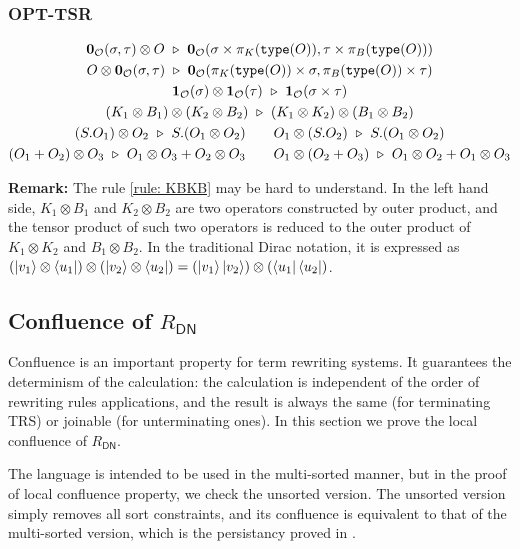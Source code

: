 \documentclass[manuscript, review, timestamp]{acmart}
\newcommand*{\type}{\texttt{type}}
\newcommand*{\reduce}{\ \triangleright\ }
\begin{document}
\subsubsection*{\textsf{OPT-TSR}}
\begin{gather}
  \mathbf{0}_\mathcal{O}(\sigma, \tau) \otimes O \reduce \mathbf{0}_\mathcal{O}(\sigma \times \pi_K(\type(O)), \tau \times \pi_B(\type(O)))
  \notag \\
  O \otimes \mathbf{0}_\mathcal{O}(\sigma, \tau) \reduce \mathbf{0}_\mathcal{O}(\pi_K(\type(O)) \times \sigma, \pi_B(\type(O)) \times \tau) \notag \\
  \mathbf{1}_\mathcal{O}(\sigma) \otimes \mathbf{1}_\mathcal{O}(\tau) \reduce \mathbf{1}_\mathcal{O}(\sigma \times \tau) \notag \\
  (K_1 \otimes B_1) \otimes (K_2 \otimes B_2) \reduce (K_1 \otimes K_2) \otimes (B_1 \otimes B_2) \label{rule: KBKB} \\
  (S.O_1) \otimes O_2 \reduce S.(O_1 \otimes O_2)
  \qquad
  O_1 \otimes (S.O_2) \reduce S.(O_1 \otimes O_2) \notag \\
  (O_1 + O_2) \otimes O_3 \reduce O_1 \otimes O_3 + O_2 \otimes O_3
  \qquad
  O_1 \otimes (O_2 + O_3) \reduce O_1 \otimes O_2 + O_1 \otimes O_3 \notag
\end{gather}

\textbf{Remark: } The rule \ref{rule: KBKB} may be hard to understand. In the left hand side, $K_1 \otimes B_1$ and $K_2 \otimes B_2$ are two operators constructed by outer product, and the tensor product of such two operators is reduced to the outer product of $K_1 \otimes K_2$ and $B_1 \otimes B_2$. In the traditional Dirac notation, it is expressed as $(\ket{v_1}\otimes\bra{u_1}) \otimes (\ket{v_2} \otimes \bra{u_2}) = (\ket{v_1}\ket{v_2}) \otimes (\bra{u_1}\bra{u_2})$.


\subsection{Confluence of $R_\textsf{DN}$}

Confluence is an important property for term rewriting systems. It guarantees the determinism of the calculation: the calculation is independent of the order of rewriting rules applications, and the result is always the same (for terminating TRS) or joinable (for unterminating ones). In this section we prove the local confluence of $R_\textsf{DN}$.

The language is intended to be used in the multi-sorted manner, but in the proof of local confluence property, we check the unsorted version. The unsorted version simply removes all sort constraints, and its confluence is equivalent to that of the multi-sorted version, which is the persistancy proved in \cite{Aoto1997}.
\end{document}

